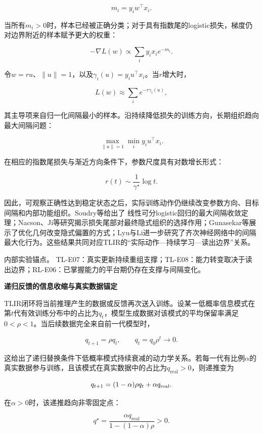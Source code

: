 \[
m_i=y_iw^\top x_i.
\]

当所有\(m_i>0\)时，样本已经被正确分类；对于具有指数尾的logistic损失，梯度仍对边界附近的样本赋予更大的权重：

\[
-\nabla L(w)\propto\sum_i y_i x_i e^{-m_i}.
\]

令\(w=ru\)、\(\|u\|=1\)，以及\(\gamma_i(u)=y_i u^\top x_i\)。当\(r\)增大时，

\[
L(w)\approx\sum_i e^{-r\gamma_i(u)},
\]

其主导项来自归一化间隔最小的样本。沿持续降低损失的训练方向，长期组织趋向最大间隔问题：

\[
\max_{\|u\|=1}\min_i y_i u^\top x_i.
\]

在相应的指数尾损失与渐近方向条件下，参数尺度具有对数增长形式：

\[
r(t)\sim\frac{1}{\gamma^\star}\log t.
\]

因此，可观察正确性达到稳定状态之后，实际训练动作仍继续改变参数方向、目标间隔和内部功能组织。Soudry等给出了 \cite{soudry2018,nacson2019,ji2019,gunasekar2018,lyu2020}线性可分logistic回归的最大间隔收敛定理；Nacson、Ji等研究揭示损失尾部对最终隐式组织的选择作用；Gunasekar等展示了优化几何改变隐式偏置的方式；Lyu与Li进一步研究了齐次神经网络中的间隔最大化行为。这些结果共同对应TLIR的“实际动作—持续学习—读出边界”关系。

内部实验锚点。 TL-E07：真实更新持续重组支撑；TL-E08：能力转变取决于读出边界；RL-E06：已掌握能力的平台期仍存在支撑与间隔变化。

\noindent\textbf{递归反馈的信息收缩与真实数据锚定}\par

TLIR闭环将当前推理产生的数据或反馈再次送入训练。设某一低概率信息模式在第\(t\)代有效训练分布中的占比为\(q_t\)，模型生成数据对该模式的平均保留率满足\(0<\rho<1\)。当后续数据完全来自前一代模型时，

\[
q_{t+1}=\rho q_t,
\qquad q_t=q_0\rho^t\longrightarrow 0.
\]

这给出了递归替换条件下低概率模式持续衰减的动力学关系。若每一代有比例\(\alpha\)的真实数据参与训练，且该模式在真实数据中的占比为\(q_{\mathrm{real}}>0\)，则递推变为

\begin{equation}
 q_{t+1}=(1-\alpha)\rho q_t+\alpha q_{\rm real}.
 \label{eq:feedback}
\end{equation}

在\(\alpha>0\)时，该递推趋向非零固定点：

\[
q^\star=\frac{\alpha q_{\mathrm{real}}}
{1-(1-\alpha)\rho}>0.
\]

